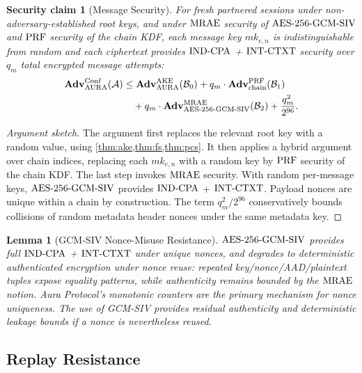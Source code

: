 \documentclass[preprint,12pt]{elsarticle}
\newtheorem{lemma}[theorem]{Lemma}
\newtheorem{securityclaim}[theorem]{Security claim}
\theoremstyle{definition}
\newcommand{\tech}[1]{\textnormal{#1}}
\newcommand{\adv}{\mathbf{Adv}}
\newcommand{\advA}{\mathcal{A}}
\newcommand{\advB}{\mathcal{B}}
\newcommand{\AEAD}{\tech{AES-256-GCM-SIV}}
\newcommand{\INDCPA}{\tech{IND-CPA}}
\newcommand{\INTCTXT}{\tech{INT-CTXT}}
\newcommand{\MRAE}{\tech{MRAE}}
\newcommand{\PRF}{\tech{PRF}}
\newcommand{\AKE}{\tech{AKE}}
\newcommand{\mk}{\mathit{mk}}
\begin{document}
\begin{securityclaim}[Message Security]\label{thm:msg-security}
For fresh partnered sessions under non-adversary-established root keys, and under $\MRAE$ security of $\AEAD$ and $\PRF$ security of the chain KDF, each message key $\mk_{e,n}$ is indistinguishable from random and each ciphertext provides $\INDCPA$ + $\INTCTXT$ security over $q_m$ total encrypted message attempts:
\begin{equation}\label{eq:msg-security-bound}
  \begin{aligned}
  \adv^{\mathrm{Conf}}_{\mathrm{AURA}}(\advA)
  &\leq \adv^{\AKE}_{\mathrm{AURA}}(\advB_0)
  + q_m \cdot \adv^{\PRF}_{\mathrm{chain}}(\advB_1)\\
  &\quad + q_m \cdot \adv^{\MRAE}_{\AEAD}(\advB_2)
  + \frac{q_m^2}{2^{96}}.
  \end{aligned}
\end{equation}
\end{securityclaim}

\begin{proof}[Argument sketch]
The argument first replaces the relevant root key with a random value, using \cref{thm:ake,thm:fs,thm:pcs}. It then applies a hybrid argument over chain indices, replacing each $\mk_{e,n}$ with a random key by $\PRF$ security of the chain KDF. The last step invokes $\MRAE$ security. With random per-message keys, $\AEAD$ provides $\INDCPA$ + $\INTCTXT$. Payload nonces are unique within a chain by construction. The term $q_m^2/2^{96}$ conservatively bounds collisions of random metadata header nonces under the same metadata key.
\end{proof}

\begin{lemma}[GCM-SIV Nonce-Misuse Resistance]\label{lem:gcm-siv}
$\AEAD$ provides full $\INDCPA$ + $\INTCTXT$ under unique nonces, and degrades
to deterministic authenticated encryption under nonce reuse: repeated
key/nonce/AAD/plaintext tuples expose equality patterns, while authenticity
remains bounded by the $\MRAE$ notion. Aura Protocol's monotonic counters are the
primary mechanism for nonce uniqueness. The use of GCM-SIV provides residual
authenticity and deterministic leakage bounds if a nonce is nevertheless
reused.
\end{lemma}

\subsection{Replay Resistance}
\end{document}
